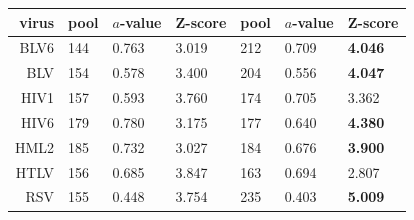 \documentclass[12pt]{article}
\newcommand{\3}{$3_{10}$}
\begin{document}
\begin{table}
\begin{tabular}{r|lll|lll|}
\hline \hline
virus  & pool & $a$-value & Z-score & pool & $a$-value & Z-score \\
\hline
BLV6   &  144  & 0.763 &      3.019  &  212  & 0.709 & {\bf 4.046} \\
BLV    &  154  & 0.578 &      3.400  &  204  & 0.556 & {\bf 4.047} \\
HIV1   &  157  & 0.593 &      3.760  &  174  & 0.705 &      3.362  \\
HIV6   &  179  & 0.780 &      3.175  &  177  & 0.640 & {\bf 4.380} \\
HML2   &  185  & 0.732 &      3.027  &  184  & 0.676 & {\bf 3.900} \\
HTLV   &  156  & 0.685 &      3.847  &  163  & 0.694 &      2.807  \\
RSV    &  155  & 0.448 &      3.754  &  235  & 0.403 & {\bf 5.009} \\
\hline \hline

\end{tabular}
\end{table}
\end{document}
